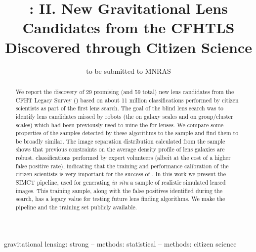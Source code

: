 \documentclass[useAMS,usenatbib,a4paper]{mn2e}
\title[New Gravitational Lens Candidates from CFHTLS]
{\SW: II. New Gravitational Lens Candidates from the CFHTLS Discovered
through Citizen Science}
\author[More et al.]{%
 
}
\begin{document}
\date{to be submitted to MNRAS}
\pagerange{\pageref{firstpage}--\pageref{lastpage}}

\maketitle

\label{firstpage}



\begin{abstract}
We report the discovery of 29 promising (and 59 total) new lens
candidates from the CFHT Legacy Survey (\cfhtls) based on about 11
million classifications performed by citizen scientists as part of the
first \sw lens search.  The goal of the blind lens search was to
identify lens candidates missed by robots (the \rf on galaxy scales and
\af on group/cluster scales) which had been previously used to mine the
\cfhtls for lenses.  We compare some properties of the samples detected
by these algorithms to the \sw sample and find them to be broadly
similar.  The image separation distribution calculated from the \sw
sample shows that previous constraints on the average density profile of
lens galaxies are robust. 
classifications performed by expert volunteers (albeit at the cost of a
higher false positive rate), indicating that the training and
performance calibration of the citizen scientists is very important for
the success of \sw. In this work we present the SIMCT pipeline, used for
generating {\it in situ} a sample of realistic  simulated lensed images.
This training sample, along with the false positives identified during
the search, has a legacy value for testing future lens finding
algorithms. We make the pipeline and the training set publicly available.
\end{abstract}

\begin{keywords}
  gravitational lensing: strong   --
  methods: statistical            --
  methods: citizen science
\end{keywords}

\setcounter{footnote}{1}

\end{document}
